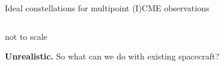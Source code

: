 \documentclass[10pt,aspectratio=169,usenames,dvipsnames]{beamer}
\newcommand{\summary}{\textcolor{mOrange}{\faArrowCircleRight}\;}
\begin{document}
\begin{frame}{Ideal constellations for multipoint (I)CME observations}
\begin{columns}[t]
\begin{column}{0.45\textwidth}
        \end{column}
    \end{columns}
    \centering
    \vspace{-0.7cm}
    \begin{flushright}
        \footnotesize not to scale
    \end{flushright}
    \vspace{-0.3cm}
    \summary \textbf{Unrealistic.} So what can we do with existing spacecraft?
    
\end{frame}
\end{document}
